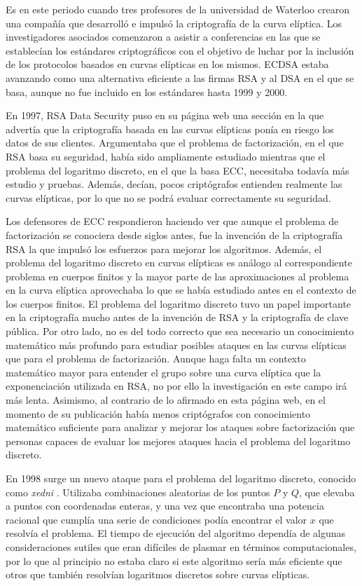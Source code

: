 \documentclass[
  a4paper,
  12pt,
  spanish,
]{scrartcl}
\begin{document}
Es en este periodo cuando tres profesores de la universidad de Waterloo crearon una compañía que desarrolló e impulsó la criptografía de la curva elíptica. Los investigadores asociados comenzaron a asistir a conferencias en las que se establecían los estándares criptográficos con el objetivo de luchar por la inclusión de los protocolos basados en curvas elípticas en los mismos. ECDSA estaba avanzando como una alternativa eficiente a las firmas RSA y al DSA en el que se basa, aunque no fue incluido en los estándares hasta 1999 y 2000.

En 1997, RSA Data Security puso en su página web una sección en la que advertía que la criptografía basada en las curvas elípticas ponía en riesgo los datos de sus clientes. Argumentaba que el problema de factorización, en el que RSA basa su seguridad, había sido ampliamente estudiado mientras que el problema del logaritmo discreto, en el que la basa ECC, necesitaba todavía más estudio y pruebas. Además, decían, pocos criptógrafos entienden realmente las curvas elípticas, por lo que no se podrá evaluar correctamente su seguridad.

Los defensores de ECC respondieron haciendo ver que aunque el problema de factorización se conociera desde siglos antes, fue la invención de la criptografía RSA la que impulsó los esfuerzos para mejorar los algoritmos. Además, el problema del logaritmo discreto en curvas elípticas es análogo al correspondiente problema en cuerpos finitos y la mayor parte de las aproximaciones al problema en la curva elíptica aprovechaba lo que se había estudiado antes en el contexto de los cuerpos finitos. El problema del logaritmo discreto tuvo un papel importante en la criptografía mucho antes de la invención de RSA y la criptografía de clave pública. Por otro lado, no es del todo correcto que sea necesario un conocimiento matemático más profundo para estudiar posibles ataques en las curvas elípticas que para el problema de factorización. Aunque haga falta un contexto matemático mayor para entender el grupo sobre una curva elíptica que la exponenciación utilizada en RSA, no por ello la investigación en este campo irá más lenta. Asimismo, al contrario de lo afirmado en esta página web, en el momento de su publicación había menos criptógrafos con conocimiento matemático suficiente para analizar y mejorar los ataques sobre factorización que personas capaces de evaluar los mejores ataques hacia el problema del logaritmo discreto.

En 1998 surge un nuevo ataque para el problema del logaritmo discreto, conocido como \textit{xedni} \parencite{silverman_xedni_2000}. Utilizaba combinaciones aleatorias de los puntos $P$ y $Q$, que elevaba a puntos con coordenadas enteras, y una vez que encontraba una potencia racional que cumplía una serie de condiciones podía encontrar el valor $x$ que resolvía el problema. El tiempo de ejecución del algoritmo dependía de algunas consideraciones sutiles que eran difíciles de plasmar en términos computacionales, por lo que al principio no estaba claro si este algoritmo sería más eficiente que otros que también resolvían logaritmos discretos sobre curvas elípticas.
\end{document}

